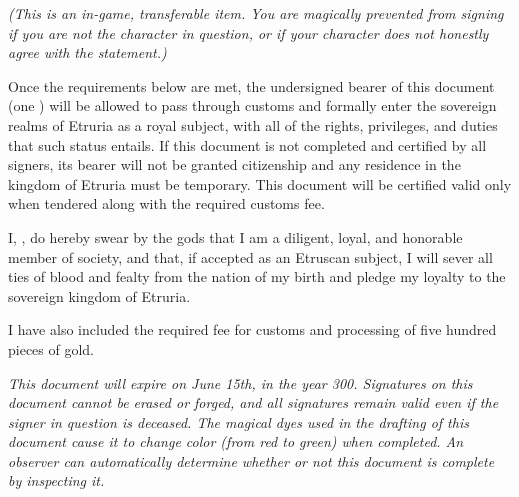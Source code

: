 \documentclass[white]{Kos}
\begin{document}
\name{\wEtruriaPapers{}}

\emph{(This is an in-game, transferable item. You are magically prevented from signing if you are not the character in question, or if your character does not honestly agree with the statement.)}

Once the requirements below are met, the undersigned bearer of this document (one \cBurglar{\MYname}) will be allowed to pass through customs and formally enter the sovereign realms of Etruria as a royal subject, with all of the rights, privileges, and duties that such status entails. If this document is not completed and certified by all signers, its bearer will not be granted citizenship and any residence in the kingdom of Etruria must be temporary. This document will be certified valid only when tendered along with the required customs fee.

I, \cBurglar{\MYname}, do hereby swear by the gods that I am a diligent, loyal, and honorable member of society, and that, if accepted as an Etruscan subject, I will sever all ties of blood and fealty from the nation of my birth and pledge my loyalty to the sovereign kingdom of Etruria.

I have also included the required fee for customs and processing of five hundred pieces of gold.

\hrulefill

\cBurglar{\MYname}

\emph{This document will expire on June 15th, in the year 300. Signatures on this document cannot be erased or forged, and all signatures remain valid even if the signer in question is deceased. The magical dyes used in the drafting of this document cause it to change color (from red to green) when completed. An observer can automatically determine whether or not this document is complete by inspecting it.}
\end{document}
